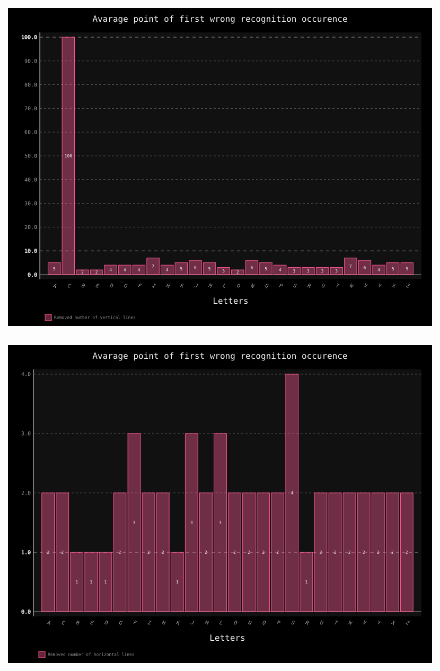 \documentclass[a4paper]{article}
\begin{document}
\begin{figure}[h!]
	\centering
	\includegraphics[scale=0.7,keepaspectratio=true]{Charts/LinesVerTestPlanResultsChart_ClasifierTester.png}	
	\caption{}
	\label{ver_lines_clas}
\end{figure}

\begin{figure}[h!]
	\centering
	\includegraphics[scale=0.7,keepaspectratio=true]{Charts/LinesHorTestPlanResultsChart_NormalTester.png}	
	\caption{}
	\label{hor_lines_trans}
\end{figure}
\end{document}
